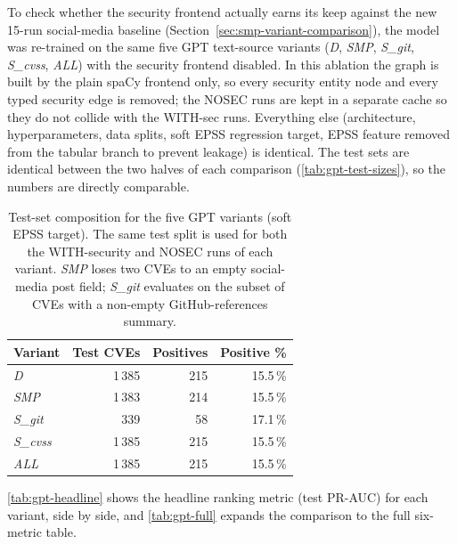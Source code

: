 \documentclass[11pt,a4paper]{article}
\begin{document}
To check whether the security frontend actually earns its
keep against the new 15-run social-media baseline
(Section~\ref{sec:smp-variant-comparison}), the model was
re-trained on the same five GPT text-source variants
(\emph{D}, \emph{SMP}, \emph{S\_git}, \emph{S\_cvss},
\emph{ALL}) with the security frontend disabled. In this
ablation the graph is built by the plain spaCy frontend
only, so every security entity node and every typed
security edge is removed; the NOSEC runs are kept in a
separate cache so they do not collide with the WITH-sec
runs. Everything else
(architecture, hyperparameters, data splits, soft EPSS
regression target, EPSS feature removed from the tabular
branch to prevent leakage) is identical. The test sets are
identical between the two halves of each comparison
(\autoref{tab:gpt-test-sizes}), so the numbers are directly
comparable.

\begin{table}[!htbp]
\centering\small
\begin{tabular}{lrrr}
\toprule
Variant & Test CVEs & Positives & Positive \% \\
\midrule
\emph{D}       & 1\,385 & 215 & 15.5\,\% \\
\emph{SMP}     & 1\,383 & 214 & 15.5\,\% \\
\emph{S\_git}  &   339 &  58 & 17.1\,\% \\
\emph{S\_cvss} & 1\,385 & 215 & 15.5\,\% \\
\emph{ALL}     & 1\,385 & 215 & 15.5\,\% \\
\bottomrule
\end{tabular}
\caption{Test-set composition for the five GPT variants
(soft EPSS target). The same test split is used for both
the WITH-security and NOSEC runs of each variant.
\emph{SMP} loses two CVEs to an empty social-media post
field; \emph{S\_git} evaluates on the subset of CVEs
with a non-empty GitHub-references summary.}
\label{tab:gpt-test-sizes}
\end{table}

\autoref{tab:gpt-headline} shows the headline ranking
metric (test PR-AUC) for each variant, side by side, and
\autoref{tab:gpt-full} expands the comparison to the full
six-metric table.
\end{document}
